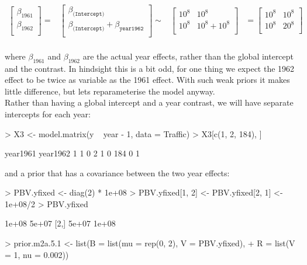 \documentclass{article}
\begin{document}
\begin{equation}
\begin{array}{rccl}
\left[
\begin{array}{c}
 \beta_{1961}\\
 \beta_{1962}\\
\end{array}
\right]
=
&
\left[
\begin{array}{c}
 \beta_{\texttt{(Intercept)}}\\
 \beta_{\texttt{(Intercept)}}+\beta_{\texttt{year1962}}\\
\end{array}
\right]
\sim
&
\left[
\begin{array}{cc}
10^8&10^8\\
10^8&10^8+10^8\\
\end{array}
\right]
&=
\left[
\begin{array}{cc}
10^8&10^8\\
10^8&20^8\\
\end{array}
\right]\\
\end{array}
\end{equation}

where $\beta_{1961}$ and $\beta_{1962}$ are the actual year effects, rather than the global intercept and the contrast. In hindsight this is a bit odd, for one thing we expect the 1962 effect to be twice as variable as the 1961 effect. With such weak priors it makes little difference, but lets reparameterise the model anyway.\\

 Rather than having a global intercept and a year contrast, we will have separate intercepts for each year:

\begin{Schunk}
\begin{Sinput}
> X3 <- model.matrix(y ~ year - 1, data = Traffic)
> X3[c(1, 2, 184), ]
\end{Sinput}
\begin{Soutput}
    year1961 year1962
1          1        0
2          1        0
184        0        1
\end{Soutput}
\end{Schunk}

and a prior that has a covariance between the two year effects:

\begin{Schunk}
\begin{Sinput}
> PBV.yfixed <- diag(2) * 1e+08
> PBV.yfixed[1, 2] <- PBV.yfixed[2, 1] <- 1e+08/2
> PBV.yfixed
\end{Sinput}
\begin{Soutput}
      [,1]  [,2]
[1,] 1e+08 5e+07
[2,] 5e+07 1e+08
\end{Soutput}
\begin{Sinput}
> prior.m2a.5.1 <- list(B = list(mu = rep(0, 2), V = PBV.yfixed), 
+     R = list(V = 1, nu = 0.002))
\end{Sinput}
\end{Schunk}
\end{document}
